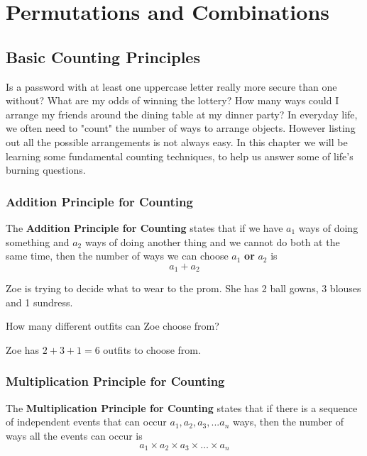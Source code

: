 \documentclass[11pt,a4paper]{book}
\begin{document}
\tableofcontents

\chapter{Permutations and Combinations}
\section{Basic Counting Principles}

Is a password with at least one uppercase letter really more secure
than one without? What are my odds of winning the lottery? How many
ways could I arrange my friends around the dining table at my dinner
party? In everyday life, we often need to "count"
the number of ways to arrange objects. However listing out all the
possible arrangements is not always easy. In this chapter we will
be learning some fundamental counting techniques, to help us answer
some of life's burning questions.

\subsection{Addition Principle for Counting}

\begin{tcolorbox}[colback=blue!5, colframe=black, boxrule=.4pt, sharpish corners]

The \textbf{Addition Principle for Counting} states that if we have
$a_{1}$ ways of doing something and $a_{2}$ ways of doing another
thing and we cannot do both at the same time, then the number of ways
we can choose $a_{1}$ \textbf{or} $a_{2}$ is
\[
a_{1}+a_{2}
\]
\end{tcolorbox}

Zoe is trying to decide what to wear to the prom. She has 2 ball gowns,
3 blouses and 1 sundress.

How many different outfits can Zoe choose from?

Zoe has $2+3+1=6$ outfits to choose from.

\subsection{Multiplication Principle for Counting}

\begin{tcolorbox}[colback=blue!5, colframe=black, boxrule=.4pt, sharpish corners]

The \textbf{Multiplication Principle for Counting} states that if
there is a sequence of independent events that can occur $a_{1},a_{2},a_{3},...a_{n}$
ways, then the number of ways all the events can occur is
\[
a_{1}\times a_{2}\times a_{3}\times\ldots\times a_{n}
\]
\end{tcolorbox}
\end{document}

